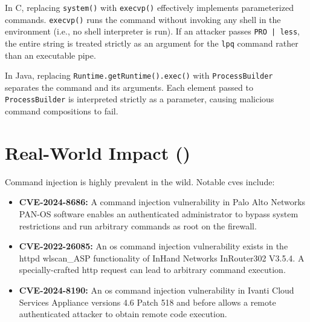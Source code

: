 In C, replacing \texttt{system()} with \texttt{execvp()} effectively implements parameterized commands. \texttt{execvp()} runs the command without invoking any shell in the environment (i.e., no shell interpreter is run). If an attacker passes \texttt{PRO | less}, the entire string is treated strictly as an argument for the \texttt{lpq} command rather than an executable pipe.

In Java, replacing \texttt{Runtime.getRuntime().exec()} with \texttt{ProcessBuilder} separates the command and its arguments. Each element passed to \texttt{ProcessBuilder} is interpreted strictly as a parameter, causing malicious command compositions to fail.

\section{Real-World Impact ()}
Command injection is highly prevalent in the wild. Notable \glspl{cve} include:
\begin{itemize}
    \item \textbf{CVE-2024-8686:} A command injection vulnerability in Palo Alto Networks PAN-OS software enables an authenticated administrator to bypass system restrictions and run arbitrary commands as root on the firewall.
    \item \textbf{CVE-2022-26085:} An \gls{os} command injection vulnerability exists in the httpd wlscan\_ASP functionality of InHand Networks InRouter302 V3.5.4. A specially-crafted \gls{http} request can lead to arbitrary command execution.
    \item \textbf{CVE-2024-8190:} An \gls{os} command injection vulnerability in Ivanti Cloud Services Appliance versions 4.6 Patch 518 and before allows a remote authenticated attacker to obtain remote code execution. 
\end{itemize}